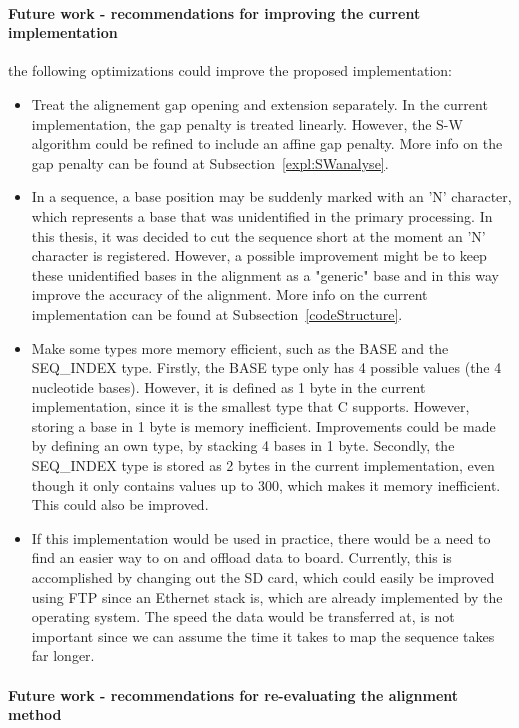 \paragraph{Future work - recommendations for improving the current implementation}

the following optimizations could improve the proposed implementation:

\begin{itemize}
	\item Treat the alignement gap opening and extension separately. In the current implementation, the gap penalty is treated linearly. However, the S-W algorithm could be refined to include an affine gap penalty. More info on the gap penalty can be found at Subsection~\ref{expl:SWanalyse}.
	\item In a sequence, a base position may be suddenly marked with an 'N' character, which represents a base that was unidentified in the primary processing. In this thesis, it was decided to cut the sequence short at the moment an 'N' character is registered. However, a possible improvement might be to keep these unidentified bases in the alignment as a "generic" base and in this way improve the accuracy of the alignment. More info on the current implementation can be found at Subsection~\ref{codeStructure}.
	\item Make some types more memory efficient, such as the BASE and the SEQ\_INDEX type. Firstly, the BASE type only has 4 possible values (the 4 nucleotide bases). However, it is defined as 1 byte in the current implementation, since it is the smallest type that C supports. However, storing a base in 1 byte is memory inefficient. Improvements could be made by defining an own type, by stacking 4 bases in 1 byte. Secondly, the SEQ\_INDEX type is stored as 2 bytes in the current implementation, even though it only contains values up to 300, which makes it memory inefficient. This could also be improved.
	\item If this implementation would be used in practice, there would be a need to find an easier way to on and offload data to board. Currently,  this is accomplished by changing out the SD card, which could easily be improved using FTP since an Ethernet stack is, which are already implemented by the operating system. The speed the data would be transferred at, is not important since we can assume the time it takes to map the sequence takes far longer. 
\end{itemize}

\paragraph{Future work - recommendations for re-evaluating the alignment method}

